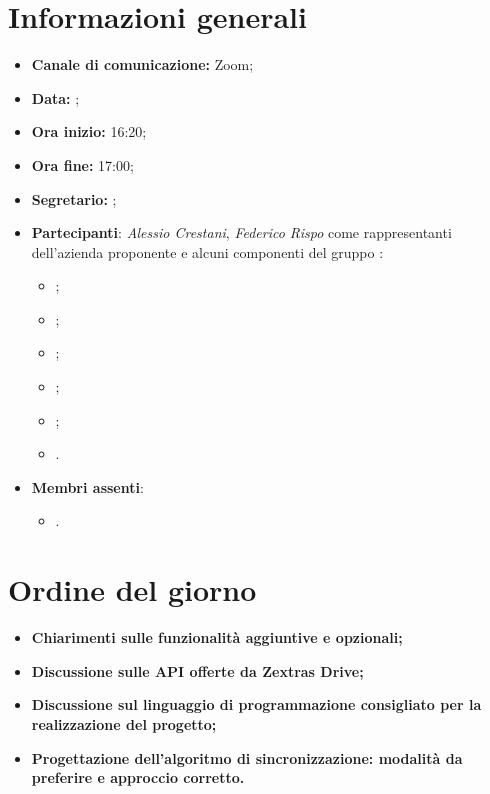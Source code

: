 \section{Informazioni generali}

\begin{itemize}

	\item \textbf{Canale di comunicazione:} Zoom;
	
	\item \textbf{Data:} \DataMeeting{};
	
	\item \textbf{Ora inizio:} 16:20;
	
	\item \textbf{Ora fine:} 17:00;
	
	\item \textbf{Segretario:} \Lucrezia{};
	
	\item \textbf{Partecipanti}: \textit{Alessio Crestani}, \textit{Federico Rispo} come rappresentanti dell'azienda proponente \proponente{} e alcuni componenti del gruppo \Gruppo{}:
	
		\begin{itemize}
			\item \Daniele{};
			\item \Davide{};
			\item \Francesco{};
			\item \Giosue{};
			\item \Lucrezia{};
			\item \Matteo{}.
		\end{itemize}



	\item \textbf{Membri assenti}:
		\begin{itemize}
			\item \Tommaso{}.
		\end{itemize}
	\end{itemize}
\section{Ordine del giorno}

\begin{itemize}
	\item\textbf{Chiarimenti sulle funzionalità aggiuntive e opzionali;}
	\item\textbf{Discussione sulle API offerte da Zextras Drive;}
	\item\textbf{Discussione sul linguaggio di programmazione consigliato per la realizzazione del progetto;}
	\item\textbf{Progettazione dell'algoritmo di sincronizzazione: modalità da preferire e approccio corretto.}


\end{itemize}

